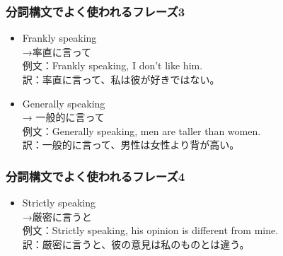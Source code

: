 \documentclass[xcolor=dvipsnames,unicode,14pt]{beamer}%
\begin{document}
\begin{frame}
  \frametitle{分詞構文でよく使われるフレーズ3}

  \begin{itemize}
    \item Frankly speaking  \\ 
          →率直に言って \\
          例文：\textcolor{NavyBlue}{Frankly speaking,} I don’t like him.\\ 
          訳：\textcolor{NavyBlue}{率直に言って}、私は彼が好きではない。
    \item Generally speaking\\ 
        → 一般的に言って \\
        例文：\textcolor{NavyBlue}{Generally speaking}, men are taller than women. \\ 
        訳：\textcolor{NavyBlue}{一般的に言って}、男性は女性より背が高い。
  \end{itemize}

\end{frame}
\begin{frame}
  \frametitle{分詞構文でよく使われるフレーズ4}

  \begin{itemize}
    \item Strictly speaking  \\ 
          →厳密に言うと \\
          例文：\textcolor{NavyBlue}{Strictly speaking}, his opinion is different from mine.\\ 
          訳：\textcolor{NavyBlue}{厳密に言うと}、彼の意見は私のものとは違う。
  \end{itemize}

\end{frame}
\end{document}
